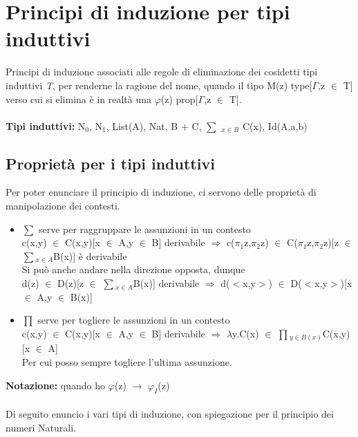 \chapter{Principi di induzione per tipi induttivi}
\label{cap:principi-di-induzione-per-tipi-induttivi}
Principi di induzione associati alle regole di eliminazione dei cosidetti tipi induttivi \textit{T}, per renderne la ragione del nome, quando il tipo M(z) type[$\Gamma$,z $\in$ T] verso cui si elimina \`e in realt\`a una $\varphi$(z) prop[$\Gamma$,z $\in$ T].\\\\
\noindent
\textbf{Tipi induttivi:} N$_0$, N$_1$, List(A), Nat, B $+$ C, {\scriptsize $\sum$} $_{x \in B}$ C(x), Id(A,a,b)\\

\section{Propriet\`a per i tipi induttivi}
\label{sec:prorieta-per-i-tipi-induttivi}
Per poter enunciare il principio di induzione, ci servono delle propriet\`a di manipolazione dei contesti.
\begin{itemize}
\item {\scriptsize $\sum$} serve per raggruppare le assunzioni in un contesto\\
c(x,y) $\in$ C(x,y)[x $\in$ A,y $\in$ B] derivabile $\Rightarrow$ c($\pi_1$z,$\pi_2$z) $\in$ C($\pi_1$z,$\pi_2$z)[z $\in$ {\scriptsize $\sum\limits$}$_{x \in A}$B(x)] \`e derivabile\\
Si pu\`o anche andare nella direzione opposta, dunque\\
d(z) $\in$ D(z)[z $\in$ {\scriptsize $\sum\limits$}$_{x \in A}$B(x)] derivabile $\Rightarrow$ d($<$x,y$>$) $\in$  D($<$x,y$>$)[x $\in$ A,y $\in$ B(x)]
\item {\scriptsize $\prod$} serve per togliere le assunzioni in un contesto\\
c(x,y) $\in$ C(x,y)[x $\in$ A,y $\in$ B] derivabile $\Rightarrow$ $\lambda$y.C(x) $\in$ {\scriptsize $\prod$}$_{y \in B(x)}$C(x,y)[x $\in$ A]\\
Per cui posso sempre togliere l'ultima assunzione.
\end{itemize}
\noindent
\textbf{Notazione:} quando ho $\varphi$(z) $\rightarrow$ $\varphi_I$(z) \\\\

\noindent
Di seguito enuncio i vari tipi di induzione, con spiegazione per il principio dei numeri Naturali.
